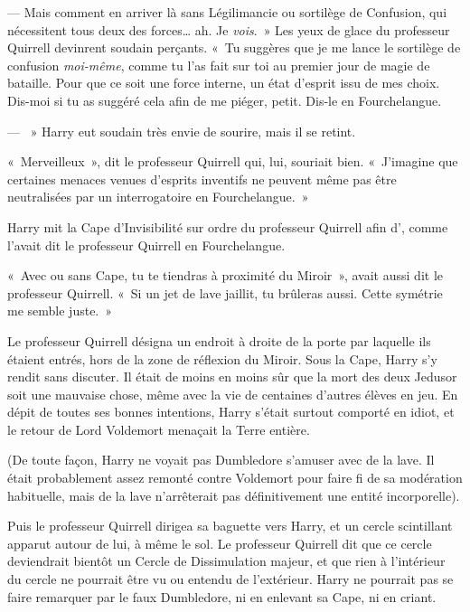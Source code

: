 --- Mais comment en arriver là sans Légilimancie ou sortilège de Confusion, qui nécessitent tous deux des forces… ah. Je \emph{vois}.~» Les yeux de glace du professeur Quirrell devinrent soudain perçants. «~Tu suggères que je me lance le sortilège de confusion \emph{moi-même}, comme tu l'as fait sur toi au premier jour de magie de bataille. Pour que ce soit une force interne, un état d'esprit issu de mes choix. Dis-moi si tu as suggéré cela afin de me piéger, petit. Dis-le en Fourchelangue.

--- ~» Harry eut soudain très envie de sourire, mais il se retint.

«~Merveilleux~», dit le professeur Quirrell qui, lui, souriait bien. «~J'imagine que certaines menaces venues d'esprits inventifs ne peuvent même pas être neutralisées par un interrogatoire en Fourchelangue.~»

\later

Harry mit la Cape d'Invisibilité sur ordre du professeur Quirrell afin d', comme l'avait dit le professeur Quirrell en Fourchelangue.

«~Avec ou sans Cape, tu te tiendras à proximité du Miroir~», avait aussi dit le professeur Quirrell. «~Si un jet de lave jaillit, tu brûleras aussi. Cette symétrie me semble juste.~»

Le professeur Quirrell désigna un endroit à droite de la porte par laquelle ils étaient entrés, hors de la zone de réflexion du Miroir. Sous la Cape, Harry s'y rendit sans discuter. Il était de moins en moins sûr que la mort des deux Jedusor soit une mauvaise chose, même avec la vie de centaines d'autres élèves en jeu. En dépit de toutes ses bonnes intentions, Harry s'était surtout comporté en idiot, et le retour de Lord Voldemort menaçait la Terre entière.

(De toute façon, Harry ne voyait pas Dumbledore s'amuser avec de la lave. Il était probablement assez remonté contre Voldemort pour faire fi de sa modération habituelle, mais de la lave n'arrêterait pas définitivement une entité incorporelle).

Puis le professeur Quirrell dirigea sa baguette vers Harry, et un cercle scintillant apparut autour de lui, à même le sol. Le professeur Quirrell dit que ce cercle deviendrait bientôt un Cercle de Dissimulation majeur, et que rien à l'intérieur du cercle ne pourrait être vu ou entendu de l'extérieur. Harry ne pourrait pas se faire remarquer par le faux Dumbledore, ni en enlevant sa Cape, ni en criant.

